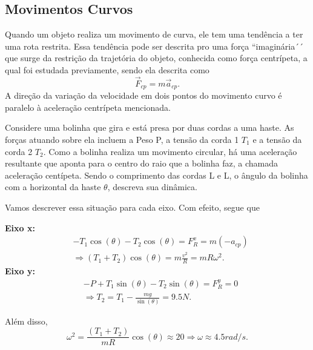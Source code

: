 \documentclass[PhysicsI/physics_notes.tex]{subfiles}
\begin{document}
\subsection{Movimentos Curvos}
Quando um objeto realiza um movimento de curva, ele tem uma tendência
a ter uma rota restrita. Essa tendência pode ser descrita pro uma força ``imaginária´´
que surge da restrição da trajetória do objeto, conhecida como
força centrípeta, a qual foi estudada previamente, sendo ela descrita como
\[
	\vec{F}_{cp} = m \vec{a}_{cp}.
\]
A direção da variação da velocidade em dois pontos do movimento curvo
é paralelo à aceleração centrípeta mencionada.
\begin{example}
	Considere uma bolinha que gira e está presa por duas cordas a uma haste.
	As forças atuando sobre ela incluem a Peso P, a tensão da corda 1 \(T_{1}\)
	e a tensão da corda 2 \(T_{2}\). Como a bolinha realiza um movimento circular,
	há uma aceleração resultante que aponta para o centro do raio que a bolinha faz,
	a chamada aceleração centípeta. Sendo o comprimento das cordas L e L, o ângulo
	da bolinha com a horizontal da haste \(\theta \), descreva sua dinâmica.

	Vamos descrever essa situação para cada eixo. Com efeito, segue que

	\textbf{Eixo x:}
	\begin{align*}
		 & -T_{1}\cos{(\theta )} - T_{2}\cos{(\theta )} = F_{R}^{x} = m(-a_{cp})   \\
		 & \Rightarrow (T_{1}+T_{2})\cos{(\theta )}=m \frac{v^2}{R} = mR\omega ^2.
	\end{align*}
	\textbf{Eixo y:}
	\begin{align*}
		 & -P + T_{1}\sin{(\theta )}-T_{2}\sin{(\theta )}=F_{R}^y = 0     \\
		 & \Rightarrow T_{2} = T_{1} - \frac{mg}{\sin{(\theta )}} = 9.5N.
	\end{align*}

	Além disso,
	\[
		\omega ^2 = \frac{(T_{1}+T_{2})}{mR}\cos{(\theta )}\approx 20 \Rightarrow \omega \approx 4.5rad/s.
	\]


\end{example}
\end{document}
